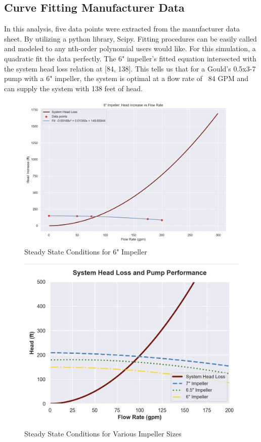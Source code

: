 \documentclass{article}
\begin{document}
\subsection{Curve Fitting Manufacturer Data}
In this analysis, five data points were extracted from the manufacturer data sheet. By utilizing a python library, Scipy. Fitting procedures can be easily called and modeled to any nth-order polynomial users would like. For this simulation, a quadratic fit the data perfectly. The 6" impeller's fitted equation intersected with the system head loss relation at [84, 138]. This tells us that for a Gould's 0.5x3-7 pump with a 6" impeller, the system is optimal at a flow rate of ~84 GPM and can supply the system with 138 feet of head.

\begin{figure}[H]
    \centering
    \includegraphics[width=0.75\linewidth]{AE5D4372-A838-4EA3-B71D-1255726D846A.jpeg}
    \caption{Steady State Conditions for 6" Impeller}
    \label{fig:impeller_6}
\end{figure}

\begin{figure}[H]
    \centering
    \includegraphics[width=0.75\linewidth]{95E131CE-68DB-4A4F-AEBB-CE40D397E913_1_105_c.jpeg}
    \caption{Steady State Conditions for Various Impeller Sizes}
    \label{fig:vary_impeller}
\end{figure}
\end{document}
